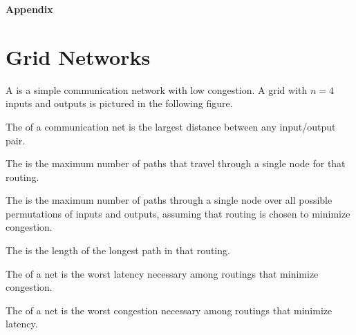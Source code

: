 \documentclass[quiz]{mcs}
\begin{document}

\examspace


\examspace


\iffalse


\examspace

\begin{center}
\LARGE \textbf{Appendix}
\end{center}

\iffalse
\section{Grid Networks}

A  is a simple communication network with low congestion.  A
grid with $n = 4$ inputs and outputs is pictured in the following figure.


The  of a communication net is the largest distance between
any input/output pair.

The  is the maximum number of paths that
travel through a single node for that routing.

The  is the maximum number of paths through a
single node over all possible permutations of inputs and outputs, assuming
that routing is chosen to minimize congestion.

The  is the length of the longest path in that
routing.
 
The  of a net is the worst
latency necessary among routings that minimize congestion.

The  of a net is the worst
congestion necessary among routings that minimize latency.
\end{document}
